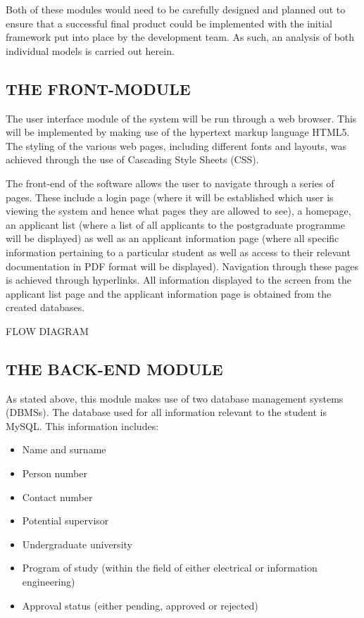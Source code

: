 \documentclass[journal,comsoc,onecolumn]{IEEEtran}
\begin{document}
\hfill \break Both of these modules would need to be carefully designed and planned out to ensure that a successful final product could be implemented with the initial framework put into place by the development team. As such, an analysis of both individual models is carried out herein.


\subsection{THE FRONT-MODULE}

The user interface module of the system will be run through a web browser. This will be implemented by making use of the hypertext markup language HTML5. The styling of the various web pages, including different fonts and layouts, was achieved through the use of Cascading Style Sheets (CSS).

\hfill \break The front-end of the software allows the user to navigate through a series of pages. These include a login page (where it will be established which user is viewing the system and hence what pages they are allowed to see), a homepage, an applicant list (where a list of all applicants to the postgraduate programme will be displayed) as well as an applicant information page (where all specific information pertaining to a particular student as well as access to their relevant documentation in PDF format will be displayed). Navigation through these pages is achieved through hyperlinks. All information displayed to the screen from the applicant list page and the applicant information page is obtained from the created databases. \break

FLOW DIAGRAM


\subsection{THE BACK-END MODULE}

As stated above, this module makes use of two database management systems (DBMSs). The database used for all information relevant to the student is MySQL. This information includes:

\begin{itemize}
	\item Name and surname
	\item Person number
	\item Contact number
	\item Potential supervisor
	\item Undergraduate university
	\item Program of study (within the field of either electrical or information engineering)
	\item Approval status (either pending, approved or rejected)
\end{itemize}
\end{document}
